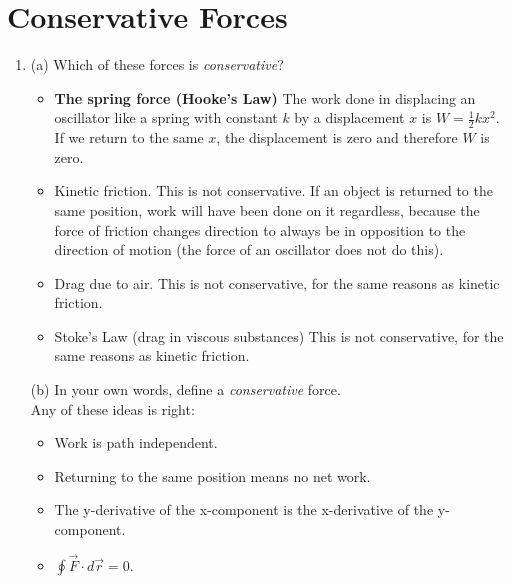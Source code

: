 \documentclass[10pt]{article}
\begin{document}
\section{Conservative Forces}
\begin{enumerate}
\item (a) Which of these forces is \textit{conservative}?
\begin{itemize}
\item \textbf{The spring force (Hooke's Law)} The work done in displacing an oscillator like a spring with constant $k$ by a displacement $x$ is $W = \frac{1}{2}kx^2$.  If we return to the same $x$, the displacement is zero and therefore $W$ is zero.
\item Kinetic friction.  This is not conservative.  If an object is returned to the same position, work will have been done on it regardless, because the force of friction changes direction to always be in opposition to the direction of motion (the force of an oscillator does not do this).
\item Drag due to air.  This is not conservative, for the same reasons as kinetic friction.
\item Stoke's Law (drag in viscous substances) This is not conservative, for the same reasons as kinetic friction.
\end{itemize}
(b) In your own words, define a \textit{conservative} force. \\
Any of these ideas is right:
\begin{itemize}
\item Work is path independent.
\item Returning to the same position means no net work.
\item The y-derivative of the x-component is the x-derivative of the y-component.
\item $\oint \vec{F} \cdot d\vec{r} = 0$.
\end{itemize}
\end{enumerate}
\end{document}
